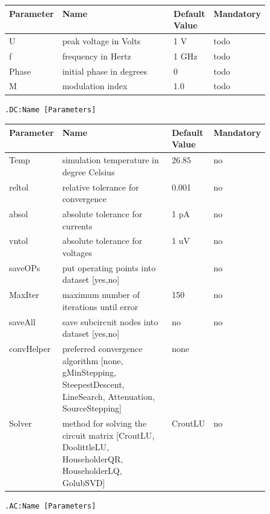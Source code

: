 \begin{tabular}{|l|p{0.5\linewidth}|l|l|}
\hline
Parameter & Name & Default Value & Mandatory \\
\hline
U & peak voltage in Volts & 1 V & todo \\
f & frequency in Hertz & 1 GHz & todo \\
Phase & initial phase in degrees & 0 & todo \\
M & modulation index & 1.0 & todo \\
\hline
\end{tabular}




\label{chap:simulation}




\begin{verbatim}
.DC:Name [Parameters]
\end{verbatim}


\begin{tabular}{|l|p{0.5\linewidth}|l|l|}
\hline
Parameter & Name & Default Value & Mandatory \\
\hline
Temp & simulation temperature in degree Celsius& $26.85$ & no \\
reltol & relative tolerance for convergence & 0.001 & no \\
absol & absolute tolerance for currents & 1 pA & no \\
vntol & absolute tolerance for voltages & 1 uV & no \\
saveOPs & put operating points into dataset [yes,no]& & no \\
MaxIter & maximum number of iterations until error & 150 & no \\
saveAll & save subcircuit nodes into dataset [yes,no]& no & no\\
convHelper & preferred convergence algorithm [none, gMinStepping, SteepestDescent, LineSearch, Attenuation, SourceStepping]& none & \\
Solver & method for solving the circuit matrix [CroutLU, DoolittleLU, HouseholderQR, HouseholderLQ, GolubSVD] & CroutLU & no \\
\hline
\end{tabular}




\begin{verbatim}
.AC:Name [Parameters]
\end{verbatim}


